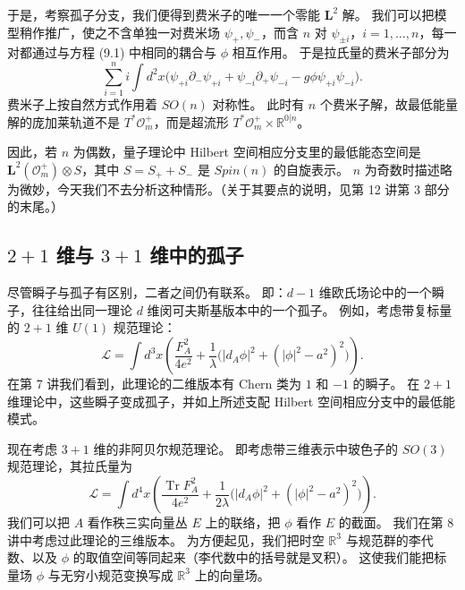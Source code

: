 于是，考察孤子分支，我们便得到费米子的唯一一个零能 $\mathbf{L}^2$ 解。
我们可以把模型稍作推广，使之不含单独一对费米场 $\psi_+,\psi_-$，而含 $n$ 对 $\psi_{\pm i}$，$i=1,\dots,n$，每一对都通过与方程 (9.1) 中相同的耦合与 $\phi$ 相互作用。
于是拉氏量的费米子部分为
\[
\sum_{i=1}^{n}i\int d^2x\bigl(\psi_{+i}\partial_-\psi_{+i}
+\psi_{-i}\partial_+\psi_{-i}-g\phi\psi_{+i}\psi_{-i}\bigr).
\]
费米子上按自然方式作用着 $SO(n)$ 对称性。
此时有 $n$ 个费米子解，故最低能量解的庞加莱轨道不是 $T^*\mathcal{O}^+_m$，而是超流形 $T^*\mathcal{O}^+_m\times\mathbb{R}^{0|n}$。

因此，若 $n$ 为偶数，量子理论中 Hilbert 空间相应分支里的最低能态空间是 $\mathbf{L}^2(\mathcal{O}^+_m)\otimes S$，其中 $S=S_++S_-$ 是 $Spin(n)$ 的自旋表示。
$n$ 为奇数时描述略为微妙，今天我们不去分析这种情形。（关于其要点的说明，见第 12 讲第 3 部分的末尾。）


\subsection{$2+1$ 维与 $3+1$ 维中的孤子}

尽管瞬子与孤子有区别，二者之间仍有联系。
即：$d-1$ 维欧氏场论中的一个瞬子，往往给出同一理论 $d$ 维闵可夫斯基版本中的一个孤子。
例如，考虑带复标量的 $2+1$ 维 $U(1)$ 规范理论：
\begin{equation}
  \tag{9.4}
  \label{eq:9-4}
  \mathcal{L}=\int d^3x\left(\frac{F_A^2}{4e^2}
  +\frac{1}{\lambda}\bigl(|d_A\phi|^2+(|\phi|^2-a^2)^2\bigr)\right).
\end{equation}
在第 7 讲我们看到，此理论的二维版本有 Chern 类为 $1$ 和 $-1$ 的瞬子。
在 $2+1$ 维理论中，这些瞬子变成孤子，并如上所述支配 Hilbert 空间相应分支中的最低能模式。

现在考虑 $3+1$ 维的非阿贝尔规范理论。
即考虑带三维表示中玻色子的 $SO(3)$ 规范理论，其拉氏量为
\begin{equation}
  \tag{9.5}
  \label{eq:9-5}
  \mathcal{L}=\int d^4x\left(\frac{\operatorname{Tr}F_A^2}{4e^2}
  +\frac{1}{2\lambda}\bigl(|d_A\phi|^2+(|\phi|^2-a^2)^2\bigr)\right).
\end{equation}
我们可以把 $A$ 看作秩三实向量丛 $E$ 上的联络，把 $\phi$ 看作 $E$ 的截面。
我们在第 8 讲中考虑过此理论的三维版本。
为方便起见，我们把时空 $\mathbb{R}^3$ 与规范群的李代数、以及 $\phi$ 的取值空间等同起来（李代数中的括号就是叉积）。
这使我们能把标量场 $\phi$ 与无穷小规范变换写成 $\mathbb{R}^3$ 上的向量场。

